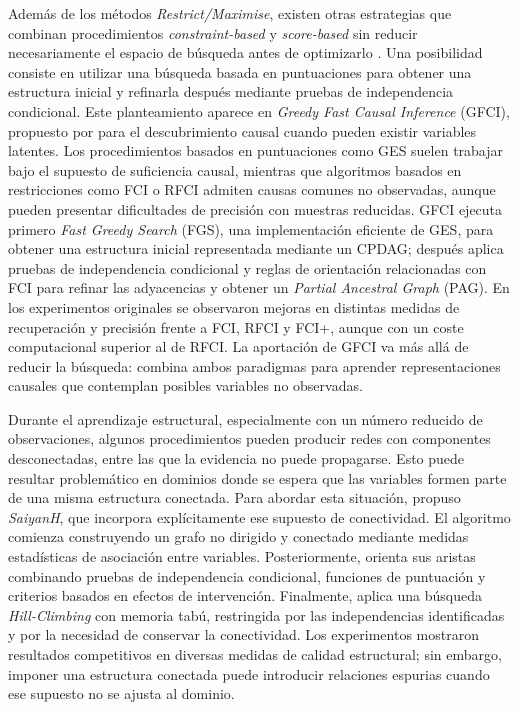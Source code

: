 Además de los métodos \textit{Restrict/Maximise}, existen otras estrategias que combinan procedimientos \textit{constraint-based} y \textit{score-based} sin reducir necesariamente el espacio de búsqueda antes de optimizarlo \citep{kitson2023survey}. Una posibilidad consiste en utilizar una búsqueda basada en puntuaciones para obtener una estructura inicial y refinarla después mediante pruebas de independencia condicional. Este planteamiento aparece en \textit{Greedy Fast Causal Inference} (GFCI), propuesto por \citet{Ogarrio2016GFCI} para el descubrimiento causal cuando pueden existir variables latentes. Los procedimientos basados en puntuaciones como GES suelen trabajar bajo el supuesto de suficiencia causal, mientras que algoritmos basados en restricciones como FCI \citep{Spirtes1995FCI} o RFCI \citep{Colombo2012RFCI} admiten causas comunes no observadas, aunque pueden presentar dificultades de precisión con muestras reducidas. GFCI ejecuta primero \textit{Fast Greedy Search} (FGS), una implementación eficiente de GES, para obtener una estructura inicial representada mediante un CPDAG; después aplica pruebas de independencia condicional y reglas de orientación relacionadas con FCI para refinar las adyacencias y obtener un \textit{Partial Ancestral Graph} (PAG). En los experimentos originales se observaron mejoras en distintas medidas de recuperación y precisión frente a FCI, RFCI y FCI+, aunque con un coste computacional superior al de RFCI. La aportación de GFCI va más allá de reducir la búsqueda: combina ambos paradigmas para aprender representaciones causales que contemplan posibles variables no observadas.

Durante el aprendizaje estructural, especialmente con un número reducido de observaciones, algunos procedimientos pueden producir redes con componentes desconectadas, entre las que la evidencia no puede propagarse. Esto puede resultar problemático en dominios donde se espera que las variables formen parte de una misma estructura conectada. Para abordar esta situación, \citet{Constantinou2020SaiyanH} propuso \textit{SaiyanH}, que incorpora explícitamente ese supuesto de conectividad. El algoritmo comienza construyendo un grafo no dirigido y conectado mediante medidas estadísticas de asociación entre variables. Posteriormente, orienta sus aristas combinando pruebas de independencia condicional, funciones de puntuación y criterios basados en efectos de intervención. Finalmente, aplica una búsqueda \textit{Hill-Climbing} con memoria tabú, restringida por las independencias identificadas y por la necesidad de conservar la conectividad. Los experimentos mostraron resultados competitivos en diversas medidas de calidad estructural; sin embargo, imponer una estructura conectada puede introducir relaciones espurias cuando ese supuesto no se ajusta al dominio.

